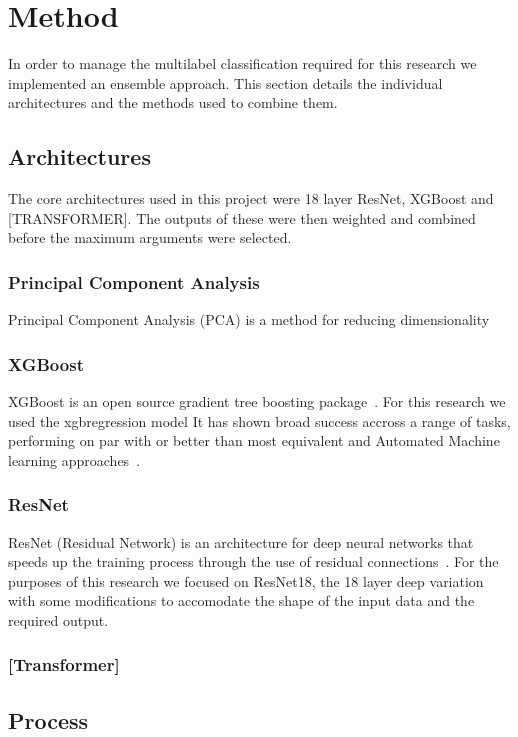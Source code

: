 \clearpage  %

\section{Method}

In order to manage the multilabel classification required for this research we implemented an ensemble approach. 
This section details the individual architectures and the methods used to combine them.

\subsection{Architectures}

The core architectures used in this project were 18 layer ResNet, XGBoost and [TRANSFORMER]. The outputs of these were 
then weighted and combined before the maximum arguments were selected.

\subsubsection{Principal Component Analysis}
Principal Component Analysis (PCA) is a method for reducing dimensionality 

\subsubsection{XGBoost}
XGBoost is an open source gradient tree boosting package~\cite{xgboost}. 
For this research we used the xgbregression model It has shown broad success accross a range of tasks, performing on par with or better than most equivalent and Automated Machine learning approaches~\cite{xgbcomp}.
\subsubsection{ResNet}
ResNet (Residual Network) is an architecture for deep neural networks that speeds up the training process through the use of residual connections~\cite{resnet}. 
For the purposes of this research we focused on ResNet18, the 18 layer deep variation with some modifications to accomodate the shape of the input data and the required output. 
\subsubsection{[Transformer]}

\subsection{Process}

